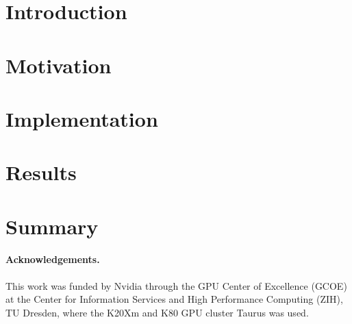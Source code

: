 \documentclass{llncs}
\begin{document}

\section{Introduction}
\label{sec:intro}



\section{Motivation}
\label{sec:motivation}


\section{Implementation}
\label{sec:implementation}


\section{Results}
\label{sec:results}


\section{Summary}
\label{sec:summary}


\paragraph{Acknowledgements.} This work was funded by Nvidia through the GPU Center of Excellence (GCOE) at the Center for Information Services and High Performance Computing (ZIH), TU Dresden, where the K20Xm and K80 GPU cluster Taurus was used.
\setcounter{biburllcpenalty}{7000}
\setcounter{biburlucpenalty}{8000}
\printbibliography
\end{document}

